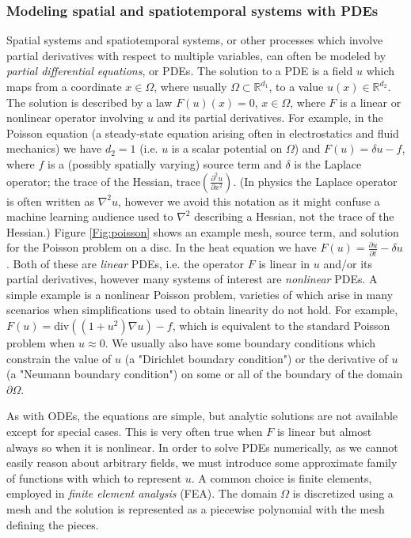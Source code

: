 \documentclass{puthesis}
\begin{document}
\subsubsection{Modeling spatial and spatiotemporal systems with PDEs}
Spatial systems and spatiotemporal systems, or other processes which involve
partial derivatives with respect to multiple variables, can often be modeled by
\emph{partial differential equations}, or PDEs.
The solution to a PDE is a field $u$ which maps from a coordinate $x \in \Omega$, where
usually $\Omega \subset \mathbb{R}^{d_1}$, to a value $u(x) \in \mathbb{R}^{d_2}$.
The solution is described by a law $F(u)(x) = 0$, $x \in \Omega$, where
$F$ is a linear or nonlinear operator involving $u$ and its partial derivatives.
For example, in the Poisson equation (a steady-state equation arising often in
electrostatics and fluid
mechanics) we have $d_2 = 1$ (i.e. $u$ is a scalar potential on $\Omega$) and
$F(u) = \delta u - f$, where $f$ is a (possibly spatially varying) source term and
$\delta$ is the Laplace operator; the trace of the Hessian,
$\text{trace}(\frac{\partial^2 u}{\partial x^2})$.
(In physics the Laplace operator is often written as $\nabla^2 u$, however
we avoid this notation as it might confuse a machine learning audience used to
$\nabla^2$ describing a Hessian, not the trace of the Hessian.)
Figure \ref{Fig:poisson} shows an example mesh, source term, and solution for the Poisson
problem on a disc.
In the heat equation we have $F(u) = \frac{\partial u}{\partial t} - \delta u$.
Both of these are \emph{linear} PDEs, i.e. the operator $F$ is linear in
$u$ and/or its partial derivatives, however many systems of interest are
\emph{nonlinear} PDEs.
A simple example is a nonlinear Poisson problem, varieties of which arise in many scenarios
when simplifications used to obtain linearity do not hold. For example,
$F(u) = \text{div}((1 + u^2) \nabla u) - f$, which is equivalent to the standard
Poisson problem when $u \approx 0$.
We usually also have some boundary conditions which constrain the value of $u$
(a "Dirichlet boundary condition") or the derivative of $u$ (a "Neumann boundary condition")
on some or all of the boundary of the domain $\partial \Omega$.

As with ODEs, the equations are simple, but analytic solutions are not available
except for special cases.
This is very often true when $F$ is linear but almost always so when it is nonlinear.
In order to solve PDEs numerically, as we cannot easily reason about arbitrary fields,
we must introduce some approximate family of functions with which to represent $u$.
A common choice is finite elements, employed in \emph{finite element analysis} (FEA).
The domain $\Omega$ is discretized using a mesh and the solution is represented as a
piecewise polynomial with the mesh defining the pieces.
\end{document}
